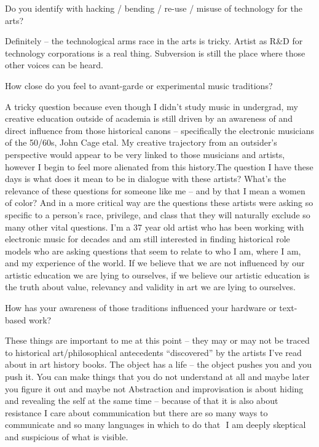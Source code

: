 Do you identify with hacking / bending / re-use / misuse of technology for the arts? 

Definitely – the technological arms race in the arts is tricky. Artist as R\&D for technology corporations is a real thing. Subversion is still the place where those other voices can be heard. 

How close do you feel to avant-garde or experimental music traditions?

A tricky question because even though I didn’t study music in undergrad, my creative education outside of academia is still driven by an awareness of and direct influence from those historical canons – specifically the electronic musicians of the 50/60s, John Cage etal. My creative trajectory from an outsider’s perspective would appear to be very linked to those musicians and artists, however I begin to feel more alienated from this history.The question I have these days is what does it mean to be in dialogue with these artists? What’s the relevance of these questions for someone like me – and by that I mean a women of color? And in a more critical way are the questions these artists were asking so specific to a person’s race, privilege, and class that they will naturally exclude so many other vital questions. I’m a 37 year old artist who has been working with electronic music for decades and am still interested in finding historical role models who are asking questions that seem to relate to who I am, where I am, and my experience of the world. If we believe that we are not influenced by our artistic education we are lying to ourselves, if we believe our artistic education is the truth about value, relevancy and validity in art we are lying to ourselves. 

How has your awareness of those traditions influenced your hardware or text-based work? 

These things are important to me at this point – they may or may not be traced to historical art/philosophical antecedents “discovered” by the artists I’ve read about in art history books. The object has a life – the object pushes you and you push it. You can make things that you do not understand at all and maybe later you figure it out and maybe not Abstraction and improvisation is about hiding and revealing the self at the same time – because of that it is also about resistance 
I care about communication but there are so many ways to communicate and so many languages in which to do that 
I am deeply skeptical and suspicious of what is visible. 





